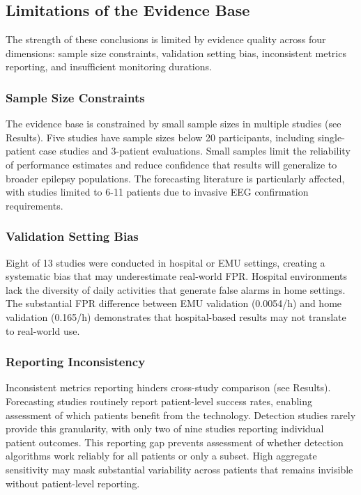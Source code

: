 \subsection{Limitations of the Evidence Base}

The strength of these conclusions is limited by evidence quality across four dimensions: sample size constraints, validation setting bias, inconsistent metrics reporting, and insufficient monitoring durations.

\subsubsection{Sample Size Constraints}

The evidence base is constrained by small sample sizes in multiple studies (see Results). Five studies have sample sizes below 20 participants, including single-patient case studies and 3-patient evaluations. Small samples limit the reliability of performance estimates and reduce confidence that results will generalize to broader epilepsy populations. The forecasting literature is particularly affected, with studies limited to 6-11 patients due to invasive EEG confirmation requirements.

\subsubsection{Validation Setting Bias}

Eight of 13 studies were conducted in hospital or EMU settings, creating a systematic bias that may underestimate real-world FPR. Hospital environments lack the diversity of daily activities that generate false alarms in home settings. The substantial FPR difference between EMU validation (0.0054/h) and home validation (0.165/h) demonstrates that hospital-based results may not translate to real-world use.

\subsubsection{Reporting Inconsistency}

Inconsistent metrics reporting hinders cross-study comparison (see Results). Forecasting studies routinely report patient-level success rates, enabling assessment of which patients benefit from the technology. Detection studies rarely provide this granularity, with only two of nine studies reporting individual patient outcomes. This reporting gap prevents assessment of whether detection algorithms work reliably for all patients or only a subset. High aggregate sensitivity may mask substantial variability across patients that remains invisible without patient-level reporting.

